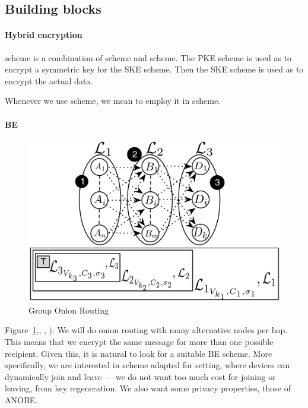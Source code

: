 \subsection{Building blocks}%
\label{BuildingBlocks}

\paragraph*{Hybrid encryption}\label{KEM}

 scheme is a combination of  scheme and  scheme.
The \ac{PKE} scheme is used as  to encrypt a symmetric key for the 
\ac{SKE} scheme.
Then the \ac{SKE} scheme is used as  to encrypt the actual data.

Whenever we use  scheme, we mean to employ it in  scheme.

\paragraph*{\Acl*{BE}}\label{BE}

\begin{figure}[t]
\centering
  \includegraphics[scale=.20]{figures/pors2.pdf}
  \caption{\label{fig:por} Group Onion Routing}
\end{figure}

Figure~\ref{fig:por},, , ).
We will do onion routing with many alternative nodes per hop.
This means that we encrypt the same message for more than one possible 
recipient.
Given this, it is natural to look for a suitable \ac{BE} scheme.
More specifically, we are interested in  scheme adapted for  
setting, where devices can dynamically join and leave --- \ie we do not want too 
much cost for joining or leaving, \eg from key regeneration.
We also want some privacy properties, \eg those of \ac{ANOBE}.

